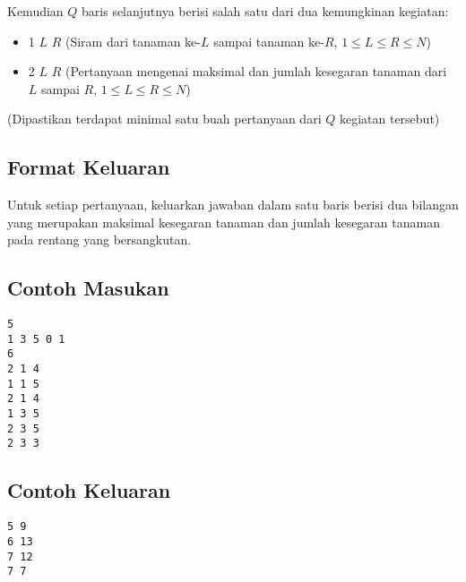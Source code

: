 \documentclass{article}
\begin{document}
Kemudian $Q$ baris selanjutnya berisi salah satu dari dua kemungkinan kegiatan:
\vspace{-\baselineskip}
\begin{itemize}
    \setlength\itemsep{0pt}
	\item 1 $L$ $R$ (Siram dari tanaman ke-$L$ sampai tanaman ke-$R$, $1 \leq L \leq R \leq N$)
	\item 2 $L$ $R$ (Pertanyaan mengenai maksimal dan jumlah kesegaran tanaman dari $L$ sampai $R$, $1 \leq L \leq R \leq N$)
\end{itemize}
\vspace{-\baselineskip}
(Dipastikan terdapat minimal satu buah pertanyaan dari $Q$ kegiatan tersebut)

\subsection*{Format Keluaran}

Untuk setiap pertanyaan, keluarkan jawaban dalam satu baris berisi dua bilangan yang merupakan maksimal kesegaran tanaman dan jumlah kesegaran tanaman pada rentang yang bersangkutan.

\begin{multicols}{2}
\subsection*{Contoh Masukan}
\begin{lstlisting}
5
1 3 5 0 1
6
2 1 4
1 1 5
2 1 4
1 3 5
2 3 5
2 3 3
\end{lstlisting}
\columnbreak
\subsection*{Contoh Keluaran}
\begin{lstlisting}
5 9
6 13
7 12
7 7

\end{lstlisting}
\vfill
\null
\end{multicols}


\pagebreak
\end{document}
